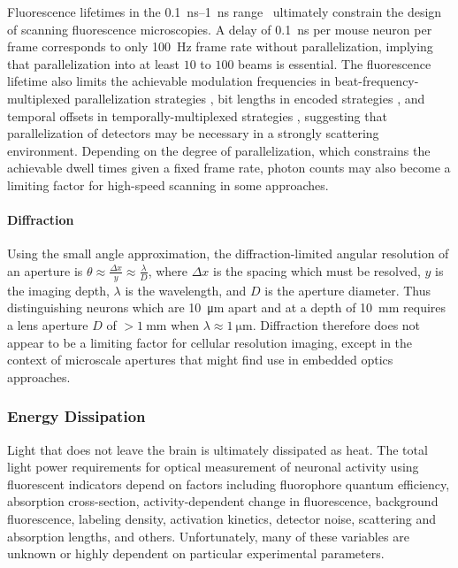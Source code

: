 Fluorescence lifetimes in the \SIrange{0.1}{1}{\nano\second} range~\cite{striker99} ultimately constrain the design of scanning fluorescence microscopies. A delay of \SI{0.1}{\nano\second} per mouse neuron per frame corresponds to only \SI{100}{\hertz} frame rate without parallelization, implying that parallelization into at least $10$ to $100$ beams is essential. The fluorescence lifetime also limits the achievable modulation frequencies in beat-frequency-multiplexed parallelization strategies \cite{diebold2013digitally}, bit lengths in encoded strategies \cite{ducros2013encoded}, and temporal offsets in temporally-multiplexed strategies \cite{cheng2011simultaneous}, suggesting that parallelization of detectors may be necessary in a strongly scattering environment. Depending on the degree of parallelization, which constrains the achievable dwell times given a fixed frame rate, photon counts may also become a limiting factor for high-speed scanning in some approaches.

\paragraph{Diffraction}
Using the small angle approximation, the diffraction-limited angular resolution of an aperture is $\theta \approx \frac{\Delta x}{y} \approx \frac{\lambda}{D}$, where $\Delta x$ is the spacing which must be resolved, $y$ is the imaging depth, $\lambda$ is the wavelength, and $D$ is the aperture diameter. Thus distinguishing neurons which are \SI{10}{\micro\meter} apart and at a depth of \SI{10}{\milli\meter} requires a lens aperture $D$ of $> \SI{1}{\milli\meter}$ when $\lambda \approx \SI{1}{\micro\meter}$. Diffraction therefore does not appear to be a limiting factor for cellular resolution imaging, except in the context of microscale apertures that might find use in embedded optics approaches.

\subsubsection{Energy Dissipation}

Light that does not leave the brain is ultimately dissipated as heat.
The total light power requirements for optical measurement of neuronal activity using fluorescent indicators depend on factors including
fluorophore quantum efficiency,
absorption cross-section,
activity-dependent change in fluorescence,
background fluorescence,
labeling density,
activation kinetics,
detector noise,
scattering and absorption lengths,
and others. Unfortunately, many of these variables are unknown or highly dependent on particular experimental parameters.

